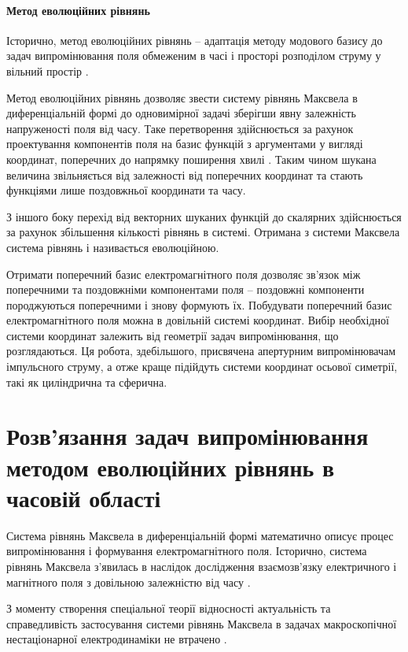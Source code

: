 \paragraph{Метод еволюційних рівнянь}

Історично, метод еволюційних рівнянь -- адаптація методу модового базису 
\cite{imp:Tretyakov1986} до задач випромінювання поля обмеженим в часі і 
просторі розподілом струму у вільний простір \cite{imp:Tretyakov2004}.

Метод еволюційних рівнянь дозволяє звести систему рівнянь Максвела в 
диференціальній формі до одновимірної задачі зберігши явну залежність 
напруженості поля від часу. Таке перетворення здійснюється за рахунок 
проектування компонентів поля на базис функцій з аргументами у вигляді 
координат, поперечних до напрямку поширення хвилі \cite{imp:Dumin2010}. 
Таким чином шукана величина звільняється від залежності від поперечних 
координат та стають функціями лише поздовжньої координати та часу.

З іншого боку перехід від векторних шуканих функцій до скалярних здійснюється
за рахунок збільшення кількості рівнянь в системі. Отримана з системи Максвела
система рівнянь і називається еволюційною.

Отримати поперечний базис електромагнітного поля дозволяє зв'язок між 
поперечними та поздовжніми компонентами поля -- поздовжні компоненти 
породжуються поперечними і знову формують їх. 
Побудувати поперечний базис електромагнітного поля можна в довільній системі 
координат. Вибір необхідної системи координат залежить від геометрії задач 
випромінювання, що розглядаються. Ця робота, здебільшого, присвячена 
апертурним випромінювачам імпульсного струму, а отже краще підійдуть 
системи координат осьової симетрії, такі як циліндрична та сферична.

\section{Розв'язання задач випромінювання методом еволюційних рівнянь
в часовій області}

Система рівнянь Максвела в диференціальній формі математично описує процес
випромінювання і формування електромагнітного поля. Історично, система рівнянь 
Максвела з'явилась в наслідок дослідження взаємозв'язку електричного і 
магнітного поля з довільною залежністю від часу \cite{imp:Maxwell1865}.

З моменту створення спеціальної теорії відносності \cite{imp:Einstein1905} 
актуальність та справедливість застосування системи рівнянь Максвела в задачах 
макроскопічної нестаціонарної електродинаміки не втрачено \cite{imp:Bray2006}.

